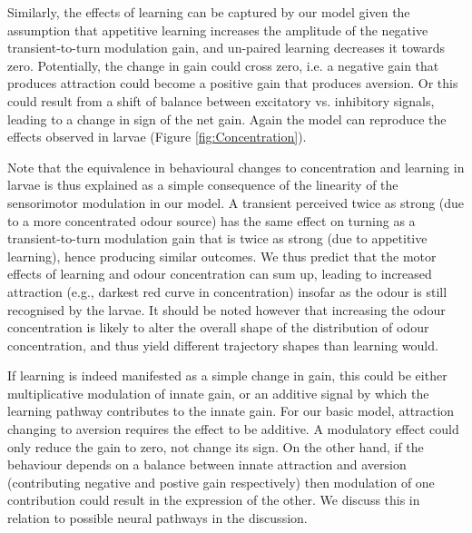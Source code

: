 \documentclass[11pt,a4paper]{article}
\begin{document}
Similarly, the effects of learning can be captured by our model given the assumption that appetitive learning increases the amplitude of the negative transient-to-turn modulation gain, and un-paired learning decreases it towards zero. Potentially, the change in gain could cross zero, i.e. a negative gain that produces attraction could become a positive gain that produces aversion. Or this could result from a shift of balance between excitatory vs. inhibitory signals, leading to a change in sign of the net gain. Again the model can reproduce the effects observed in larvae (Figure \ref{fig:Concentration}). 

Note that the equivalence in behavioural changes to concentration and learning in larvae is thus explained as a simple consequence of the linearity of the sensorimotor modulation in our model. A transient perceived twice as strong (due to a more concentrated odour source) has the same effect on turning as a transient-to-turn modulation gain that is twice as strong (due to appetitive learning), hence producing similar outcomes. We thus predict that the motor effects of learning and odour concentration can sum up, leading to increased attraction (e.g., darkest red curve in concentration) insofar as the odour is still recognised by the larvae. It should be noted however that increasing the odour concentration is likely to alter the overall shape of the distribution of odour concentration, and thus yield different trajectory shapes than learning would.

If learning is indeed manifested as a simple change in gain, this could be either multiplicative modulation of innate gain, or an additive signal by which the learning pathway contributes to the innate gain. For our basic model, attraction changing to aversion requires the effect to be additive. A modulatory effect could only reduce the gain to zero, not change its sign. On the other hand, if the behaviour depends on a balance between innate attraction and aversion (contributing negative and postive gain respectively) then modulation of one contribution could result in the expression of the other. We discuss this in relation to possible neural pathways in the discussion.
\end{document}
